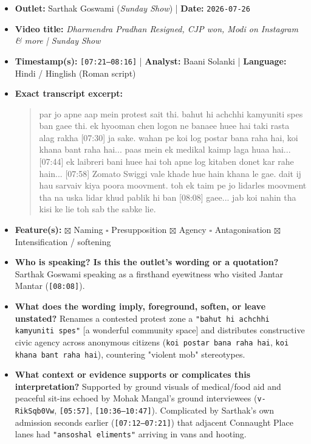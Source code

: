 \documentclass[10pt,a4paper]{article}
\begin{document}
\begin{itemize}[leftmargin=1.5em, itemsep=3pt, topsep=4pt]
  \item \textbf{Outlet:} Sarthak Goswami (\textit{Sunday Show}) | \textbf{Date:} \texttt{2026-07-26}
  \item \textbf{Video title:} \textit{Dharmendra Pradhan Resigned, CJP won, Modi on Instagram \& more | Sunday Show}
  \item \textbf{Timestamp(s):} \texttt{[07:21--08:16]} | \textbf{Analyst:} Baani Solanki | \textbf{Language:} Hindi / Hinglish (Roman script)
  \item \textbf{Exact transcript excerpt:}
    \begin{quote}\small\ttfamily [07:21] par jo apne aap mein protest sait thi. bahut hi achchhi kamyuniti spes ban gaee thi. ek hyooman chen logon ne banaee huee hai taki rasta alag rakha [07:30] ja sake. wahan pe koi log postar bana raha hai, koi khana bant raha hai... paas mein ek medikal kaimp laga huaa hai... [07:44] ek laibreri bani huee hai toh apne log kitaben donet kar rahe hain... [07:58] Zomato Swiggi vale khade hue hain khana le gae. dait ij hau sarvaiv kiya poora moovment. toh ek taim pe jo lidarles moovment tha na uska lidar khud pablik hi ban [08:08] gaee... jab koi nahin tha kisi ke lie toh sab the sabke lie.\end{quote}
  \item \textbf{Feature(s):} $\boxtimes$ Naming $\square$ Presupposition $\boxtimes$ Agency $\square$ Antagonisation $\boxtimes$ Intensification / softening
  \item \textbf{Who is speaking? Is this the outlet's wording or a quotation?} Sarthak Goswami speaking as a firsthand eyewitness who visited Jantar Mantar (\texttt{[08:08]}).
  \item \textbf{What does the wording imply, foreground, soften, or leave unstated?} Renames a contested protest zone a \texttt{"bahut hi achchhi kamyuniti spes"} [a wonderful community space] and distributes constructive civic agency across anonymous citizens (\texttt{koi postar bana raha hai}, \texttt{koi khana bant raha hai}), countering "violent mob" stereotypes.
  \item \textbf{What context or evidence supports or complicates this interpretation?} Supported by ground visuals of medical/food aid and peaceful sit-ins echoed by Mohak Mangal's ground interviewees (\texttt{v-RikSqb0Vw}, \texttt{[05:57]}, \texttt{[10:36--10:47]}). Complicated by Sarthak's own admission seconds earlier (\texttt{[07:12--07:21]}) that adjacent Connaught Place lanes had \texttt{"ansoshal eliments"} arriving in vans and hooting.

\end{itemize}
\end{document}
